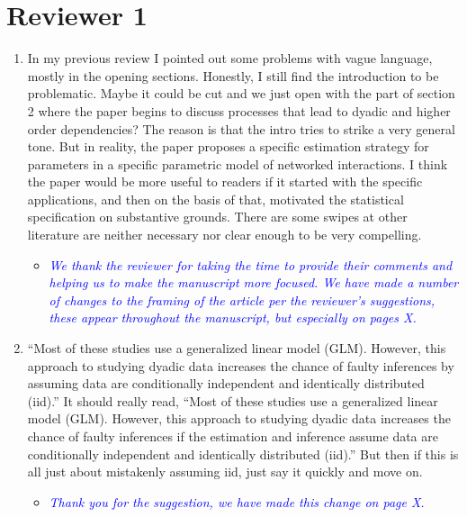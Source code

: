 \section*{Reviewer 1}

\begin{enumerate}
	\item In my previous review I pointed out some problems with vague language, mostly in the opening sections.   Honestly, I still find the introduction to be problematic. Maybe it could be cut and we just open with the part of section 2 where the paper begins to discuss processes that lead to dyadic and higher order dependencies?  The reason is that the intro tries to strike a very general tone.  But in reality, the paper proposes a specific estimation strategy for parameters in a specific parametric model of networked interactions.  I think the paper would be more useful to readers if it started with the specific applications, and then on the basis of that, motivated the statistical specification on substantive grounds.  There are some swipes at other literature are neither necessary nor clear enough to be very compelling.
	\begin{itemize}
		\item \emph{ \textcolor{blue}{
		We thank the reviewer for taking the time to provide their comments and helping us to make the manuscript more focused. We have made a number of changes to the framing of the article per the reviewer's suggestions, these appear throughout the manuscript, but especially on pages X.
		}}
	\end{itemize}
	\item ``Most of these studies use a generalized linear model (GLM). However, this approach to studying dyadic data increases the chance of faulty inferences by assuming data are conditionally independent and identically distributed (iid).'' It should really read, ``Most of these studies use a generalized linear model (GLM). However, this approach to studying dyadic data increases the chance of faulty inferences if the estimation and inference assume data are conditionally independent and identically distributed (iid).''  But then if this is all just about mistakenly assuming iid, just say it quickly and move on.
	\begin{itemize}
		\item  \emph{ \textcolor{blue}{
		Thank you for the suggestion, we have made this change on page X.
		}}
	\end{itemize}

\end{enumerate}
